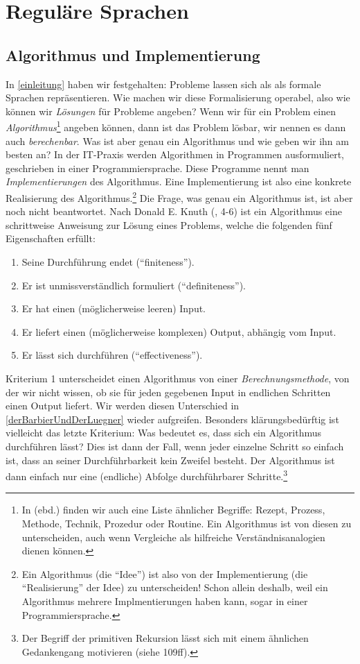 \chapter{Reguläre Sprachen}

\section{Algorithmus und Implementierung}

In \autoref{einleitung} haben wir festgehalten:
Probleme lassen sich als als formale Sprachen repräsentieren.
Wie machen wir diese Formalisierung operabel,
also wie können wir \emph{Lösungen} für Probleme angeben?
Wenn wir für ein Problem einen \emph{Algorithmus}\footnote{
    In \cite{knuth1} (ebd.) finden wir auch eine Liste ähnlicher Begriffe:
    Rezept, Prozess, Methode, Technik, Prozedur oder Routine.
    Ein Algorithmus ist von diesen zu unterscheiden,
    auch wenn Vergleiche als hilfreiche Verständnisanalogien dienen können.
}
angeben können, dann ist das Problem lösbar,
wir nennen es dann auch \emph{berechenbar}.
Was ist aber genau ein Algorithmus und wie geben wir ihn am besten an?
In der IT-Praxis werden Algorithmen in Programmen ausformuliert,
geschrieben in einer Programmiersprache.
Diese Programme nennt man \emph{Implementierungen} des Algorithmus.
Eine Implementierung ist also eine konkrete Realisierung des Algorithmus.\footnote{
    Ein Algorithmus (die ``Idee'') ist also von
    der Implementierung (die ``Realisierung'' der Idee) zu unterscheiden!
    Schon allein deshalb,
    weil ein Algorithmus mehrere Implmentierungen haben kann,
    sogar in einer Programmiersprache.}
Die Frage, was genau ein Algorithmus ist, ist aber noch nicht beantwortet.
Nach Donald E. Knuth (\cite{knuth1}, 4-6)
ist ein Algorithmus eine schrittweise Anweisung zur Lösung eines Problems,
welche die folgenden fünf Eigenschaften erfüllt:
\begin{enumerate}
    \item Seine Durchführung endet (``finiteness'').
    \item Er ist unmissverständlich formuliert (``definiteness'').
    \item Er hat einen (möglicherweise leeren) Input.
    \item Er liefert einen (möglicherweise komplexen) Output, abhängig vom Input.
    \item Er lässt sich durchführen (``effectiveness'').
\end{enumerate}

Kriterium 1 unterscheidet einen Algorithmus von einer \emph{Berechnungsmethode},
von der wir nicht wissen,
ob sie für jeden gegebenen Input in endlichen Schritten einen Output liefert.
Wir werden diesen Unterschied in \autoref{derBarbierUndDerLuegner} wieder aufgreifen.
Besonders klärungsbedürftig ist vielleicht das letzte Kriterium:
Was bedeutet es, dass sich ein Algorithmus durchführen lässt?
Dies ist dann der Fall, wenn jeder einzelne Schritt so einfach ist,
dass an seiner Durchführbarkeit kein Zweifel besteht.
Der Algorithmus ist dann einfach nur eine (endliche)
Abfolge durchführbarer Schritte.\footnote{Der Begriff der primitiven Rekursion
lässt sich mit einem ähnlichen Gedankengang motivieren (siehe \cite{schoening} 109ff).}

